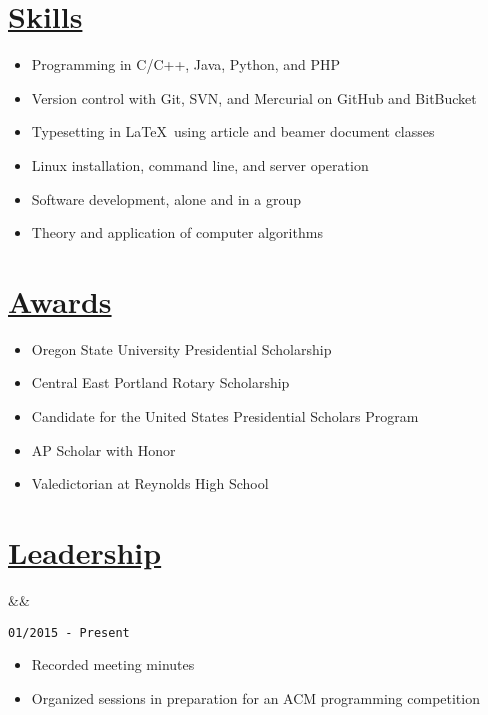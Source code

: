 \documentclass[11pt]{article}
\newcommand{\heading}[1]{
    \section*{\uline{\hfill #1}}
}
\newcommand{\squish}{
    \setlength{\itemsep}{0pt}
    \setlength{\parskip}{0pt}
    \setlength{\parsep}{0pt}
}
\newcommand{\when}[1]{
    \hfill \texttt{#1}%
}
\newcommand{\experience}[3]{
    \ifx&#2&
        \item[{#1}]
    \else
        \item[{#1}, \emph{#2}]
    \fi
    \when{#3}%
}
\begin{document}
\heading{Skills}%

\begin{itemize} [leftmargin=1.35cm]\squish
	\item Programming in C/C++, Java, Python, and PHP
	\item Version control with Git, SVN, and Mercurial on GitHub and BitBucket
	\item Typesetting in \LaTeX \, using article and beamer document classes
	\item Linux installation, command line, and server operation
	\item Software development, alone and in a group
	\item Theory and application of computer algorithms
\end{itemize}

\heading{Awards}%
\begin{itemize}[leftmargin=1.35cm]\squish
	\item Oregon State University Presidential Scholarship
	\item Central East Portland Rotary Scholarship
	\item Candidate for the United States Presidential Scholars Program
	\item AP Scholar with Honor
	\item Valedictorian at Reynolds High School
\end{itemize}
\heading{Leadership}%

\begin{description}
\squish
\experience{Oregon State University ACM Student Chapter -- Secretary}
	{}
	{01/2015 - Present}%
	\vspace*{-4pt}
	\begin{itemize} [leftmargin=*]\squish
		\item Recorded meeting minutes
		\item Organized sessions in preparation for an ACM programming competition
	\end{itemize}
	
\end{description}
\end{document}
